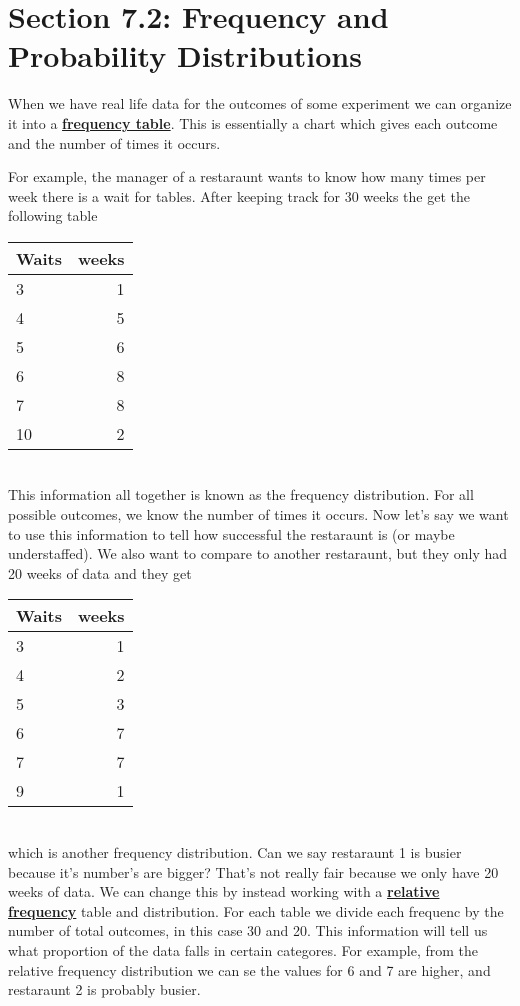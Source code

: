\documentclass[14,fleqn]{article}
\newcommand{\defn}[1]{\textbf{\underline{#1}}}
\begin{document}
\section{Section 7.2: Frequency and Probability Distributions}

When we have real life data for the outcomes of some experiment we can organize it into a \defn{frequency table}. This is essentially a chart which gives each outcome and the number of times it occurs.

For example, the manager of a restaraunt wants to know how many times per week there is a wait for tables. After keeping track for 30 weeks the get the following table\\
\begin{tabular}{l|r}
	Waits&weeks\\\hline
	3&1\\\hline
	4&5\\\hline
	5&6\\\hline
	6&8\\\hline
	7&8\\\hline
	10&2\\\hline
\end{tabular}\\
This information all together is known as the frequency distribution. For all possible outcomes, we know the number of times it occurs. Now let's say we want to use this information to tell how successful the restaraunt is (or maybe understaffed). We also want to compare to another restaraunt, but they only had 20 weeks of data and they get\\
\begin{tabular}{l|r}
	Waits&weeks\\\hline
	3&1\\\hline
	4&2\\\hline
	5&3\\\hline
	6&7\\\hline
	7&7\\\hline
	9&1\\\hline
\end{tabular}\\
which is another frequency distribution. Can we say restaraunt 1 is busier because it's number's are bigger? That's not really fair because we only have 20 weeks of data. We can change this by instead working with a \defn{relative frequency} table and distribution. For each table we divide each frequenc by the number of total outcomes, in this case 30 and 20. This information will tell us what proportion of the data falls in certain categores. For example, from the relative frequency distribution we can se the values for 6 and 7 are higher, and restaraunt 2 is probably busier. 
\end{document}
